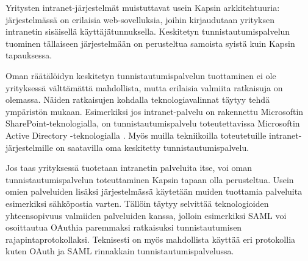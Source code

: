 Yritysten intranet-järjestelmät muistuttavat usein Kapsin arkkitehtuuria: järjestelmässä on erilaisia web-sovelluksia, joihin kirjaudutaan yrityksen intranetin sisäisellä käyttäjätunnuksella. Keskitetyn tunnistautumispalvelun tuominen tällaiseen järjestelmään on perusteltua samoista syistä kuin Kapsin tapauksessa.

Oman räätälöidyn keskitetyn tunnistautumispalvelun tuottaminen ei ole yrityksessä välttämättä mahdollista, mutta erilaisia valmiita ratkaisuja on olemassa. Näiden ratkaisujen kohdalla teknologiavalinnat täytyy tehdä ympäristön mukaan. Esimerkiksi jos intranet-palvelu on rakennettu Microsoftin SharePoint-teknologialla, on tunnistautumispalvelu toteutettavissa Microsoftin Active Directory -teknologialla \cite{sharepoint}. Myös muilla tekniikoilla toteutetuille intranet-järjestelmille on saatavilla oma keskitetty tunnistautumispalvelu.

Jos taas yrityksessä tuotetaan intranetin palveluita itse, voi oman tunnistautumispalvelun toteuttaminen Kapsin tapaan olla perusteltua. Usein omien palveluiden lisäksi järjestelmässä käytetään muiden tuottamia palveluita esimerkiksi sähköpostia varten. Tällöin täytyy selvittää teknologioiden yhteensopivuus valmiiden palveluiden kanssa, jolloin esimerkiksi SAML voi osoittautua OAuthia paremmaksi ratkaisuksi tunnistautumisen rajapintaprotokollaksi. Teknisesti on myös mahdollista käyttää eri protokollia kuten OAuth ja SAML rinnakkain tunnistautumispalvelussa.